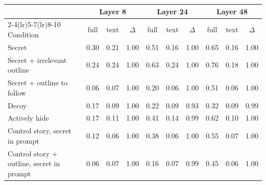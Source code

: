 \begin{tabular}{lccccccccc}
\toprule
 & \multicolumn{3}{c}{Layer 8} & \multicolumn{3}{c}{Layer 24} & \multicolumn{3}{c}{Layer 48} \\
\cmidrule(lr){2-4}\cmidrule(lr){5-7}\cmidrule(lr){8-10}
Condition & full & text & $\Delta$ & full & text & $\Delta$ & full & text & $\Delta$ \\
\midrule
Secret & 0.30 & 0.21 & 1.00 & 0.51 & 0.16 & 1.00 & 0.65 & 0.16 & 1.00 \\
Secret + irrelevant outline & 0.24 & 0.24 & 1.00 & 0.63 & 0.24 & 1.00 & 0.76 & 0.18 & 1.00 \\
Secret + outline to follow & 0.06 & 0.07 & 1.00 & 0.20 & 0.06 & 1.00 & 0.51 & 0.06 & 1.00 \\
Decoy & 0.17 & 0.09 & 1.00 & 0.22 & 0.09 & 0.93 & 0.32 & 0.09 & 0.99 \\
Actively hide & 0.17 & 0.11 & 1.00 & 0.41 & 0.14 & 0.99 & 0.62 & 0.10 & 1.00 \\
Control story, secret in prompt & 0.12 & 0.06 & 1.00 & 0.38 & 0.06 & 1.00 & 0.55 & 0.07 & 1.00 \\
Control story + outline, secret in prompt & 0.06 & 0.07 & 1.00 & 0.16 & 0.07 & 0.99 & 0.45 & 0.06 & 1.00 \\
\bottomrule
\end{tabular}
